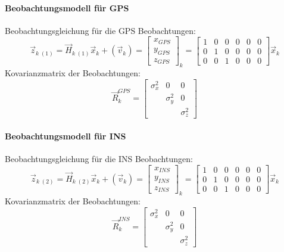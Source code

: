 \paragraph{Beobachtungsmodell für GPS}

Beobachtungsgleichung für die GPS Beobachtungen:
\begin{equation}
 	\vec{z}_{k\;(1)} = \vec{H}_{k\;(1)} \vec{x}_k + (\vec{v}_k) = \begin{bmatrix}x_{GPS}\\y_{GPS}\\z_{GPS}\end{bmatrix}_k = 
		\begin{bmatrix}
			1&0&0&0&0&0\\
			0&1&0&0&0&0\\
			0&0&1&0&0&0
		\end{bmatrix} \vec{x}_k
\end{equation}
Kovarianzmatrix der Beobachtungen:
\begin{equation}
 	\vec{R}_k^{GPS} = \begin{bmatrix}\sigma_x^2&0&0\\&\sigma_y^2&0\\&&\sigma_z^2\end{bmatrix}
\end{equation}

\paragraph{Beobachtungsmodell für INS}

Beobachtungsgleichung für die INS Beobachtungen:
\begin{equation}
 	\vec{z}_{k\;(2)} = \vec{H}_{k\;(2)} \vec{x}_k + (\vec{v}_k) = \begin{bmatrix}x_{INS}\\y_{INS}\\z_{INS}\end{bmatrix}_k = 
		\begin{bmatrix}
			1&0&0&0&0&0\\
			0&1&0&0&0&0\\
			0&0&1&0&0&0
		\end{bmatrix} \vec{x}_k
\end{equation}
Kovarianzmatrix der Beobachtungen:
\begin{equation}
 	\vec{R}_k^{INS} = \begin{bmatrix}\sigma_{x}^2&0&0\\&\sigma_{y}^2&0\\&&\sigma_{z}^2\end{bmatrix}
\end{equation}

